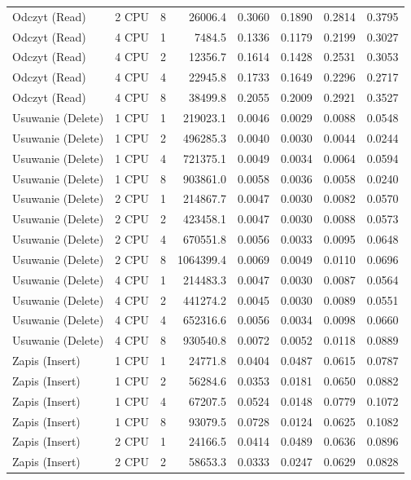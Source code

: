\begin{table}[ht]
{\begin{tabular}{llcrrrrr}
Odczyt (Read) & 2 CPU & 8 & 26006.4 & 0.3060 & 0.1890 & 0.2814 & 0.3795 \\
Odczyt (Read) & 4 CPU & 1 & 7484.5 & 0.1336 & 0.1179 & 0.2199 & 0.3027 \\
Odczyt (Read) & 4 CPU & 2 & 12356.7 & 0.1614 & 0.1428 & 0.2531 & 0.3053 \\
Odczyt (Read) & 4 CPU & 4 & 22945.8 & 0.1733 & 0.1649 & 0.2296 & 0.2717 \\
Odczyt (Read) & 4 CPU & 8 & 38499.8 & 0.2055 & 0.2009 & 0.2921 & 0.3527 \\
Usuwanie (Delete) & 1 CPU & 1 & 219023.1 & 0.0046 & 0.0029 & 0.0088 & 0.0548 \\
Usuwanie (Delete) & 1 CPU & 2 & 496285.3 & 0.0040 & 0.0030 & 0.0044 & 0.0244 \\
Usuwanie (Delete) & 1 CPU & 4 & 721375.1 & 0.0049 & 0.0034 & 0.0064 & 0.0594 \\
Usuwanie (Delete) & 1 CPU & 8 & 903861.0 & 0.0058 & 0.0036 & 0.0058 & 0.0240 \\
Usuwanie (Delete) & 2 CPU & 1 & 214867.7 & 0.0047 & 0.0030 & 0.0082 & 0.0570 \\
Usuwanie (Delete) & 2 CPU & 2 & 423458.1 & 0.0047 & 0.0030 & 0.0088 & 0.0573 \\
Usuwanie (Delete) & 2 CPU & 4 & 670551.8 & 0.0056 & 0.0033 & 0.0095 & 0.0648 \\
Usuwanie (Delete) & 2 CPU & 8 & 1064399.4 & 0.0069 & 0.0049 & 0.0110 & 0.0696 \\
Usuwanie (Delete) & 4 CPU & 1 & 214483.3 & 0.0047 & 0.0030 & 0.0087 & 0.0564 \\
Usuwanie (Delete) & 4 CPU & 2 & 441274.2 & 0.0045 & 0.0030 & 0.0089 & 0.0551 \\
Usuwanie (Delete) & 4 CPU & 4 & 652316.6 & 0.0056 & 0.0034 & 0.0098 & 0.0660 \\
Usuwanie (Delete) & 4 CPU & 8 & 930540.8 & 0.0072 & 0.0052 & 0.0118 & 0.0889 \\
Zapis (Insert) & 1 CPU & 1 & 24771.8 & 0.0404 & 0.0487 & 0.0615 & 0.0787 \\
Zapis (Insert) & 1 CPU & 2 & 56284.6 & 0.0353 & 0.0181 & 0.0650 & 0.0882 \\
Zapis (Insert) & 1 CPU & 4 & 67207.5 & 0.0524 & 0.0148 & 0.0779 & 0.1072 \\
Zapis (Insert) & 1 CPU & 8 & 93079.5 & 0.0728 & 0.0124 & 0.0625 & 0.1082 \\
Zapis (Insert) & 2 CPU & 1 & 24166.5 & 0.0414 & 0.0489 & 0.0636 & 0.0896 \\
Zapis (Insert) & 2 CPU & 2 & 58653.3 & 0.0333 & 0.0247 & 0.0629 & 0.0828 \\

\end{tabular}}
\end{table}
